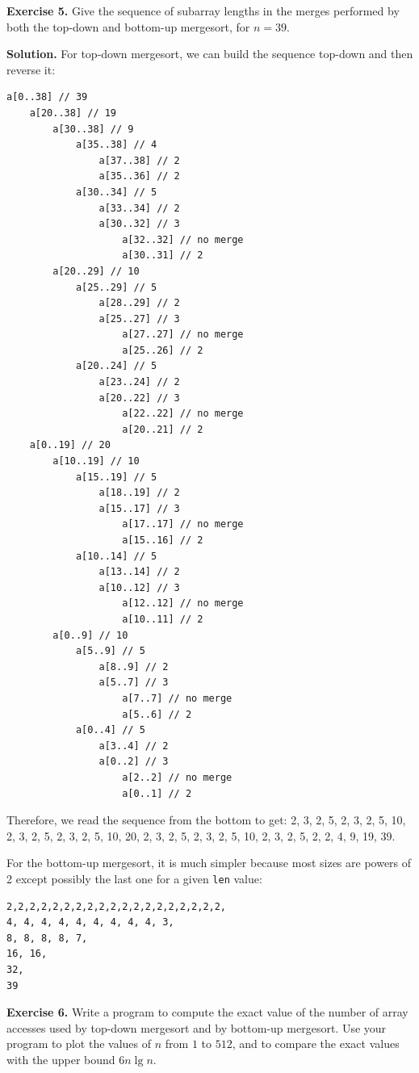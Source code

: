 \documentclass[12pt, a4paper]{article}
\newenvironment{ex}[2][Exercise]
{\par\medskip\noindent \textbf{#1 #2.}}
{\medskip}
\newenvironment{sol}[1][Solution]
{\par\medskip\noindent \textbf{#1.} }
{\medskip}
\begin{document}
	\begin{ex}{5}
		Give the sequence of subarray lengths in the merges performed by both the top-down
		and bottom-up mergesort, for $n=39$.
	\end{ex}
	\begin{sol}
		For top-down mergesort, we can build the sequence top-down and then reverse it:
		\begin{lstlisting}[language={}]
a[0..38] // 39
	a[20..38] // 19
		a[30..38] // 9
			a[35..38] // 4
				a[37..38] // 2
				a[35..36] // 2
			a[30..34] // 5
				a[33..34] // 2
				a[30..32] // 3
					a[32..32] // no merge
					a[30..31] // 2
		a[20..29] // 10
			a[25..29] // 5
				a[28..29] // 2
				a[25..27] // 3
					a[27..27] // no merge
					a[25..26] // 2
			a[20..24] // 5
				a[23..24] // 2
				a[20..22] // 3
					a[22..22] // no merge
					a[20..21] // 2
	a[0..19] // 20
		a[10..19] // 10
			a[15..19] // 5
				a[18..19] // 2
				a[15..17] // 3
					a[17..17] // no merge
					a[15..16] // 2
			a[10..14] // 5
				a[13..14] // 2
				a[10..12] // 3
					a[12..12] // no merge
					a[10..11] // 2
		a[0..9] // 10
			a[5..9] // 5
				a[8..9] // 2
				a[5..7] // 3
					a[7..7] // no merge
					a[5..6] // 2
			a[0..4] // 5
				a[3..4] // 2
				a[0..2] // 3
					a[2..2] // no merge
					a[0..1] // 2
		\end{lstlisting}
		Therefore, we read the sequence from the bottom to get:
		2, 3, 2, 5, 2, 3, 2, 5, 10,
		2, 3, 2, 5, 2, 3, 2, 5, 10,
		20,
		2, 3, 2, 5, 2, 3, 2, 5, 10,
		2, 3, 2, 5, 2, 2, 4, 9, 19,
		39.
		
		For the bottom-up mergesort, it is much simpler because most sizes are powers of 2 except
		possibly the last one for a given \texttt{len} value:
		\begin{lstlisting}
2,2,2,2,2,2,2,2,2,2,2,2,2,2,2,2,2,2,2,
4, 4, 4, 4, 4, 4, 4, 4, 4, 3,
8, 8, 8, 8, 7,
16, 16,
32,
39
		\end{lstlisting}
	\end{sol}
	\begin{ex}{6}
		Write a program to compute the exact value of the number of array accesses used
		by top-down mergesort and by bottom-up mergesort. Use your program to plot the
		values of $n$ from $1$ to $512$, and to compare the exact values with the upper bound
		$6n\lg n$.
	\end{ex}
\end{document}
